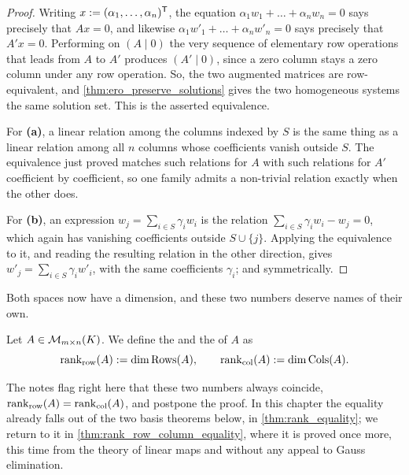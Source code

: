 \begin{proof}
Writing $x := (\alpha_{1}, \dots, \alpha_{n})^{\mathsf{T}}$, the equation $\alpha_{1} w_{1} + \dots + \alpha_{n} w_{n} = 0$ says precisely that $Ax = 0$, and likewise $\alpha_{1} w'_{1} + \dots + \alpha_{n} w'_{n} = 0$ says precisely that $A'x = 0$. Performing on $(A \mid 0)$ the very sequence of elementary row operations that leads from $A$ to $A'$ produces $(A' \mid 0)$, since a zero column stays a zero column under any row operation. So, the two augmented matrices are row-equivalent, and \cref{thm:ero_preserve_solutions} gives the two homogeneous systems the same solution set. This is the asserted equivalence.

For \textbf{(a)}, a linear relation among the columns indexed by $S$ is the same thing as a linear relation among all $n$ columns whose coefficients vanish outside $S$. The equivalence just proved matches such relations for $A$ with such relations for $A'$ coefficient by coefficient, so one family admits a non-trivial relation exactly when the other does.

For \textbf{(b)}, an expression $w_{j} = \sum_{i \in S} \gamma_{i} w_{i}$ is the relation $\sum_{i \in S} \gamma_{i} w_{i} - w_{j} = 0$, which again has vanishing coefficients outside $S \cup \{j\}$. Applying the equivalence to it, and reading the resulting relation in the other direction, gives $w'_{j} = \sum_{i \in S} \gamma_{i} w'_{i}$, with the same coefficients $\gamma_{i}$; and symmetrically.
\end{proof}

Both spaces now have a dimension, and these two numbers deserve names of their own.

\begin{definition}
\label{def:row_and_column_rank}
Let $A \in \mathcal{M}_{m \times n}(K)$. We define the  and the  of $A$ as
\[
\operatorname{rank}_{\text{row}}(A) := \dim \operatorname{Rows}(A), \qquad \operatorname{rank}_{\text{col}}(A) := \dim \operatorname{Cols}(A).
\]
\end{definition}

\begin{remark}
The notes flag right here that these two numbers always coincide, $\operatorname{rank}_{\text{row}}(A) = \operatorname{rank}_{\text{col}}(A)$, and postpone the proof. In this chapter the equality already falls out of the two basis theorems below, in \cref{thm:rank_equality}; we return to it in \cref{thm:rank_row_column_equality}, where it is proved once more, this time from the theory of linear maps and without any appeal to Gauss elimination.
\end{remark}

